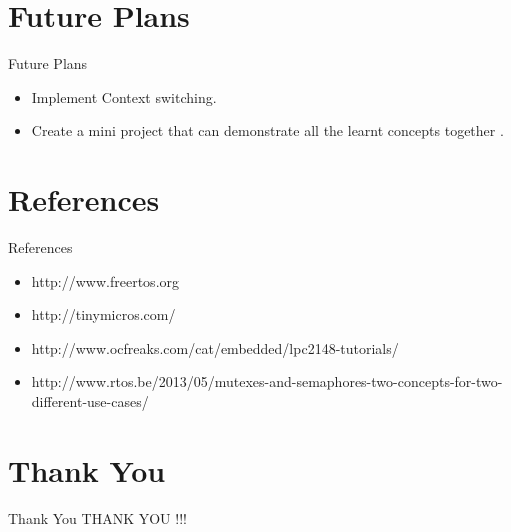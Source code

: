 \documentclass[10pt, a4paper]{beamer}
\begin{document}
\section{Future Plans}
\begin{frame}{Future Plans}
    \begin{itemize}
        \item Implement Context switching.
        \item Create a mini project that can demonstrate all the learnt concepts together . 
        
    \end{itemize}
\end{frame}

\section{References}
\begin{frame}{References}
    \begin{itemize}
        \item http://www.freertos.org
        \item http://tinymicros.com/
        \item http://www.ocfreaks.com/cat/embedded/lpc2148-tutorials/
        \item http://www.rtos.be/2013/05/mutexes-and-semaphores-two-concepts-for-two-different-use-cases/
    \end{itemize}
\end{frame}

\section{Thank You}
\begin{frame}{Thank You}
    \centering THANK YOU !!!
\end{frame}
\end{document}
